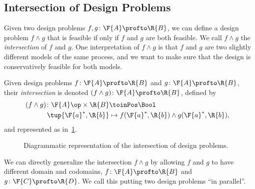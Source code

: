 \subsection{Intersection of Design Problems}

Given two design problems $f, g \colon \F{A} \profto \R{B}$, we can define a design problem $f \wedge g$ that is feasible if only if $f$ and $g$ are both feasible. We call $f \wedge g$ the \emph{intersection} of $f$ and $g$. One interpretation of $f \wedge g$ is that $f$ and $g$ are two slightly different models of the same process, and we want to make sure that the design is conservatively feasible for both models.

\begin{definition}
  Given design problems $f\colon \F{A} \profto \R{B}$ and $g\colon \F{A} \profto \R{B}$,
  their \emph{intersection} is denoted $(f \wedge g)\colon \F{A} \profto \R{B}$, defined by
  \begin{equation}
    \begin{aligned}
      (f \wedge g)\colon \F{A}\op \times \R{B} & \toinPos \Bool \\
      \tup{\F{a}^*, \R{b}} & \mapsto f(\F{a}^*, \R{b}) \wedge  g(\F{a}^*, \R{b}),
    \end{aligned}
  \end{equation}
  and represented as in~\cref{fig:intersectiondp}.
\end{definition}

\begin{figure}[h!]
  \begin{center}
  \end{center}
  \caption{Diagrammatic representation of the intersection of design problems. \label{fig:intersectiondp}}
\end{figure}

We can directly generalize the intersection $f \wedge g$ by allowing $f$ and $g$ to have different domain and codomains, $f \colon \F{A} \profto \R{B}$ and $g \colon \F{C} \profto \R{D}$. We call this putting two design problems ``in parallel''.

